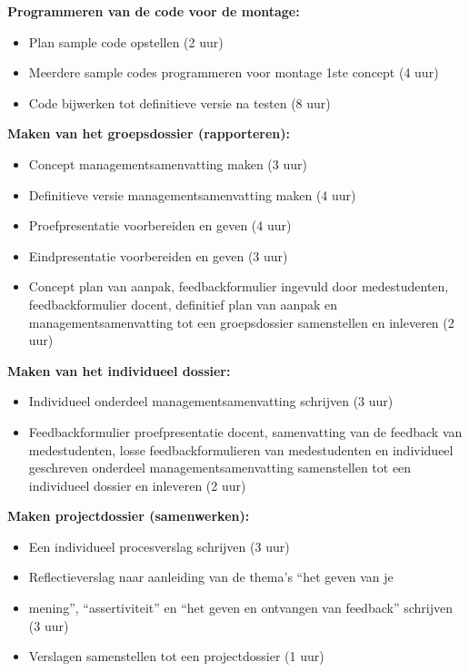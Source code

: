 \documentclass[oneside]{book}
\begin{document}
\textbf{Programmeren van de code voor de montage:}
\begin{itemize}
\item Plan sample code opstellen (2 uur)
\item Meerdere sample codes programmeren  voor montage 1ste concept (4 uur)
\item Code bijwerken tot definitieve versie na testen (8 uur)
\end{itemize}

\textbf{Maken van het groepsdossier (rapporteren):}
\begin{itemize}
\item Concept managementsamenvatting maken (3 uur)
\item Definitieve versie managementsamenvatting maken (4 uur)
\item Proefpresentatie voorbereiden en geven (4 uur)
\item Eindpresentatie voorbereiden en geven (3 uur)
\item Concept plan van aanpak, feedbackformulier ingevuld door medestudenten, feedbackformulier docent, definitief plan van aanpak en managementsamenvatting tot een groepsdossier samenstellen en inleveren (2 uur)
\end{itemize}

\textbf{Maken van het individueel dossier:}
\begin{itemize}
\item Individueel onderdeel managementsamenvatting schrijven (3 uur)
\item Feedbackformulier proefpresentatie docent, samenvatting van de feedback van medestudenten, losse feedbackformulieren van medestudenten en individueel geschreven onderdeel managementsamenvatting samenstellen tot een individueel dossier en inleveren (2 uur)
\end{itemize}

\textbf{Maken projectdossier (samenwerken):}
\begin{itemize}
\item Een individueel procesverslag schrijven (3 uur)
\item Reflectieverslag naar aanleiding van de thema’s “het geven van je \item mening”, “assertiviteit” en “het geven en ontvangen van feedback” schrijven (3 uur)
\item Verslagen samenstellen tot een projectdossier (1 uur)
\end{itemize}

\clearpage
\end{document}
